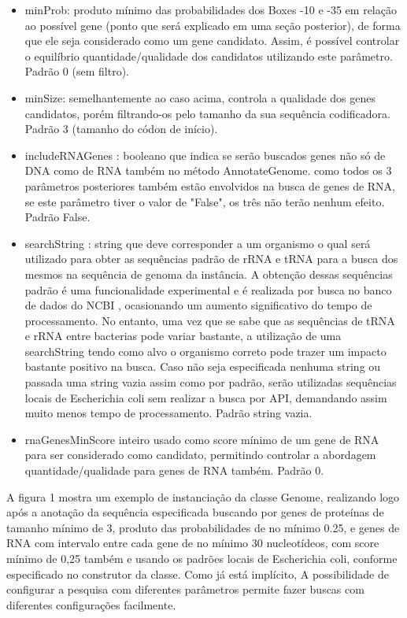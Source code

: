\documentclass[brazilian,12pt,a4paper,final]{article}
\begin{document}
	\begin{itemize}
		\item minProb: produto mínimo das probabilidades dos Boxes -10 e -35 em relação ao possível gene (ponto
		que será explicado em uma seção posterior), de forma que ele seja
		considerado como um gene candidato. Assim, é possível controlar o equilíbrio quantidade/qualidade
		dos candidatos utilizando este parâmetro. Padrão 0 (sem filtro).
		
		\item minSize: semelhantemente ao caso acima, controla a qualidade dos genes candidatos, porém filtrando-os pelo
		tamanho da sua sequência codificadora. Padrão 3 (tamanho do códon de início).
		
		\item includeRNAGenes : booleano que indica se serão buscados genes não só de DNA como de RNA também no método 
		AnnotateGenome. como todos os 3 parâmetros posteriores também estão envolvidos na busca
		de genes de RNA, se este parâmetro tiver o valor de "False", os três não terão nenhum efeito.
		Padrão False.
		\item  searchString : string que deve corresponder a um organismo o qual será utilizado para obter as sequências padrão
		de rRNA e tRNA para a busca dos mesmos na sequência de genoma da instância. A obtenção dessas 
		sequências padrão é uma funcionalidade experimental e é realizada por busca no banco de dados do NCBI
		, ocasionando um aumento significativo do tempo de processamento. No entanto, uma vez que se sabe que as sequências de tRNA e rRNA entre bacterias pode variar bastante, a utilização de uma searchString tendo como alvo o organismo correto pode trazer um impacto bastante positivo na busca. Caso não seja especificada nenhuma string
		ou passada uma string vazia assim como por padrão, serão utilizadas sequências locais de Escherichia coli sem 
		realizar a busca por API, demandando assim muito menos tempo de processamento. 
		Padrão string vazia.							    
		\item rnaGenesMinScore inteiro usado como score mínimo de um gene de RNA para ser considerado como candidato, permitindo controlar a abordagem quantidade/qualidade para genes de RNA também. Padrão 0.
	\end{itemize}
	
	
	A figura 1 mostra um exemplo de instanciação da classe Genome, realizando logo após a anotação da sequência especificada buscando por genes de proteínas 
	de tamanho mínimo de 3, produto das probabilidades de no mínimo 0.25, e genes de RNA com intervalo entre cada gene de no mínimo 30 nucleotídeos, com 
	score mínimo de 0,25 também e usando os padrões locais de Escherichia coli, conforme especificado no construtor da classe. Como já está implícito,
	A possibilidade de configurar a pesquisa com diferentes parâmetros permite fazer buscas com diferentes configurações facilmente.
	
\end{document}
